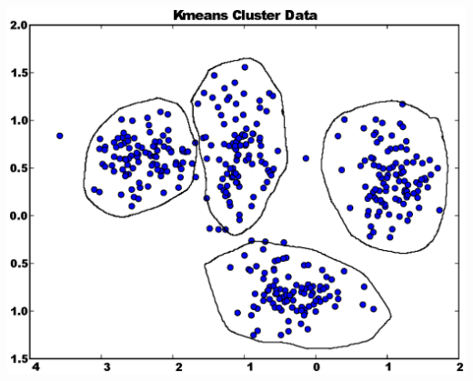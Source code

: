 \documentclass[12pt,letterpaper]{article}
\begin{document}
\begin{enumerate}
\begin{enumerate}
		\includegraphics[width=6in]{kmeans_scatter.eps} \\[15mm]
		

\end{enumerate}
\end{enumerate}
\end{document}
